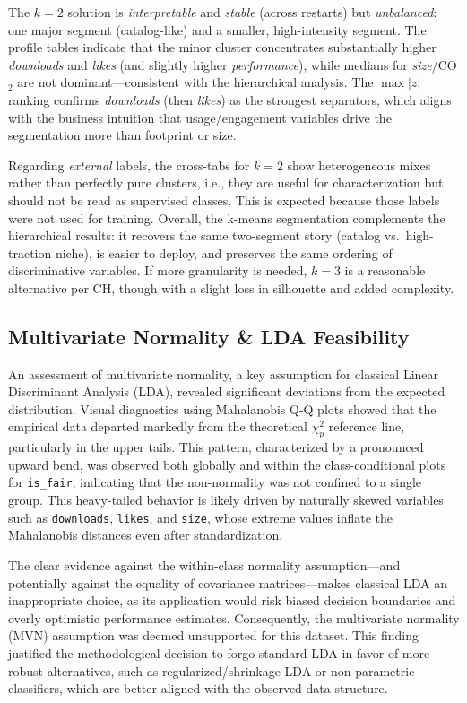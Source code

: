 \documentclass[journal]{IEEEtran}
\begin{document}
The $k{=}2$ solution is \emph{interpretable} and \emph{stable} (across restarts) but
\emph{unbalanced}: one major segment (catalog-like) and a smaller, high-intensity segment.
The profile tables indicate that the minor cluster concentrates substantially higher
\emph{downloads} and \emph{likes} (and slightly higher \emph{performance}), while medians for
\emph{size}/CO$_2$ are not dominant—consistent with the hierarchical analysis.
The $\max|z|$ ranking confirms \textit{downloads} (then \textit{likes}) as the strongest
separators, which aligns with the business intuition that usage/engagement variables
drive the segmentation more than footprint or size.

Regarding \emph{external} labels, the cross-tabs for $k{=}2$ show heterogeneous mixes
rather than perfectly pure clusters, i.e., they are useful for characterization but should
not be read as supervised classes. This is expected because those labels were not used for
training. Overall, the k-means segmentation complements the hierarchical results:
it recovers the same two-segment story (catalog vs.\ high-traction niche), is easier to
deploy, and preserves the same ordering of discriminative variables. If more granularity
is needed, $k{=}3$ is a reasonable alternative per CH, though with a slight loss in
silhouette and added complexity.

\subsection{Multivariate Normality \& LDA Feasibility}

An assessment of multivariate normality, a key assumption for classical Linear Discriminant Analysis (LDA), revealed significant deviations from the expected distribution. Visual diagnostics using Mahalanobis Q-Q plots showed that the empirical data departed markedly from the theoretical $\chi^2_p$ reference line, particularly in the upper tails. This pattern, characterized by a pronounced upward bend, was observed both globally and within the class-conditional plots for \texttt{is\_fair}, indicating that the non-normality was not confined to a single group. This heavy-tailed behavior is likely driven by naturally skewed variables such as \texttt{downloads}, \texttt{likes}, and \texttt{size}, whose extreme values inflate the Mahalanobis distances even after standardization.

The clear evidence against the within-class normality assumption—and potentially against the equality of covariance matrices—makes classical LDA an inappropriate choice, as its application would risk biased decision boundaries and overly optimistic performance estimates. Consequently, the multivariate normality (MVN) assumption was deemed unsupported for this dataset. This finding justified the methodological decision to forgo standard LDA in favor of more robust alternatives, such as regularized/shrinkage LDA or non-parametric classifiers, which are better aligned with the observed data structure.
\end{document}
